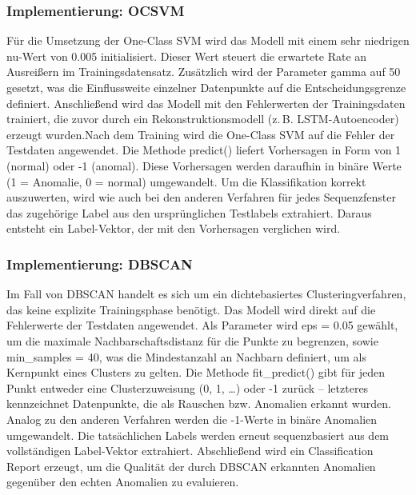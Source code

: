 \documentclass[a4paper,12pt]{article}
\begin{document}
	\subsubsection{Implementierung: OCSVM}
	Für die Umsetzung der One-Class SVM wird das Modell mit einem sehr niedrigen nu-Wert von 0.005 initialisiert. Dieser Wert steuert die erwartete Rate an Ausreißern im Trainingsdatensatz. Zusätzlich wird der Parameter gamma auf 50 gesetzt, was die Einflussweite einzelner Datenpunkte auf die Entscheidungsgrenze definiert. Anschließend wird das Modell mit den Fehlerwerten der Trainingsdaten trainiert, die zuvor durch ein Rekonstruktionsmodell (z.\,B. LSTM-Autoencoder) erzeugt wurden.Nach dem Training wird die One-Class SVM auf die Fehler der Testdaten angewendet. Die Methode predict() liefert Vorhersagen in Form von 1 (normal) oder -1 (anomal). Diese Vorhersagen werden daraufhin in binäre Werte (1 = Anomalie, 0 = normal) umgewandelt. Um die Klassifikation korrekt auszuwerten, wird wie auch bei den anderen Verfahren für jedes Sequenzfenster das zugehörige Label aus den ursprünglichen Testlabels extrahiert. Daraus entsteht ein Label-Vektor, der mit den Vorhersagen verglichen wird.
	
	\subsubsection{Implementierung: DBSCAN}
	Im Fall von DBSCAN handelt es sich um ein dichtebasiertes Clusteringverfahren, das keine explizite Trainingsphase benötigt. Das Modell wird direkt auf die Fehlerwerte der Testdaten angewendet. Als Parameter wird eps = 0.05 gewählt, um die maximale Nachbarschaftsdistanz für die Punkte zu begrenzen, sowie min\_samples = 40, was die Mindestanzahl an Nachbarn definiert, um als Kernpunkt eines Clusters zu gelten. Die Methode fit\_predict() gibt für jeden Punkt entweder eine Clusterzuweisung (0, 1, …) oder -1 zurück – letzteres kennzeichnet Datenpunkte, die als Rauschen bzw. Anomalien erkannt wurden.
	Analog zu den anderen Verfahren werden die -1-Werte in binäre Anomalien umgewandelt. Die tatsächlichen Labels werden erneut sequenzbasiert aus dem vollständigen Label-Vektor extrahiert. Abschließend wird ein Classification Report erzeugt, um die Qualität der durch DBSCAN erkannten Anomalien gegenüber den echten Anomalien zu evaluieren.
	
\end{document}
